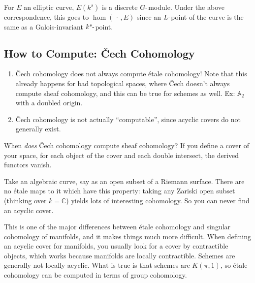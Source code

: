 \begin{example}[?]

For \(E\) an elliptic curve, \(E(k^s)\) is a discrete
\(G{\hbox{-}}\)module. Under the above correspondence, this goes to
\(\hom({\,\cdot\,}, E)\) since an \(L{\hbox{-}}\)point of the curve is
the same as a Galois-invariant \(k^s{\hbox{-}}\)point.

\end{example}

\hypertarget{how-to-compute-ux10dech-cohomology}{%
\subsection{How to Compute: Čech
Cohomology}\label{how-to-compute-ux10dech-cohomology}}

\begin{warnings}

\envlist

\begin{enumerate}
\def\labelenumi{\arabic{enumi}.}
\item
  Čech cohomology does not always compute étale cohomology! Note that
  this already happens for bad topological spaces, where Čech doesn't
  always compute sheaf cohomology, and this can be true for schemes as
  well. Ex: \({\mathbb{A}}_2\) with a doubled origin.
\item
  Čech cohomology is not actually ``computable'', since acyclic covers
  do not generally exist.
\end{enumerate}

\end{warnings}

When \emph{does} Čech cohomology compute sheaf cohomology? If you define
a cover of your space, for each object of the cover and each double
intersect, the derived functors vanish.

\begin{example}[?]

Take an algebraic curve, say as an open subset of a Riemann surface.
There are no étale maps to it which have this property: taking any
Zariski open subset (thinking over \(k={\mathbb{C}}\)) yields lots of
interesting cohomology. So you can never find an acyclic cover.

\end{example}

\begin{remark}

This is one of the major differences between étale cohomology and
singular cohomology of manifolds, and it makes things much more
difficult. When defining an acyclic cover for manifolds, you usually
look for a cover by contractible objects, which works because manifolds
are locally contractible. Schemes are generally not locally acyclic.
What is true is that schemes are \(K(\pi, 1)\), so étale cohomology can
be computed in terms of group cohomology.

\end{remark}

